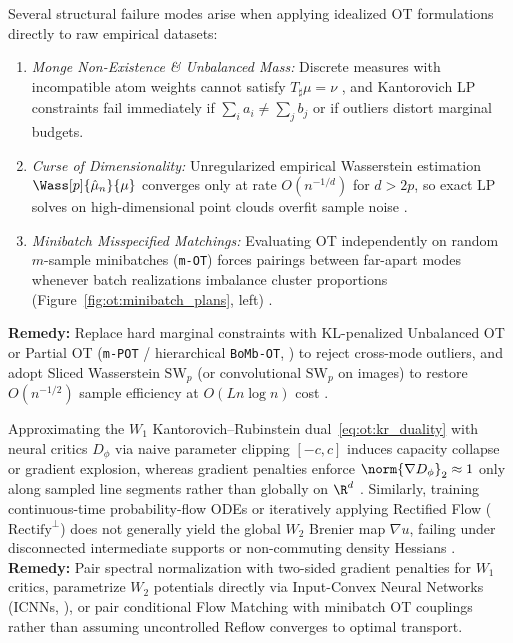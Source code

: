 \documentclass[../../../../master.tex]{subfiles}
\begin{document}
\begin{pitfall}
\label{pit:ot:support_minibatch}
Several structural failure modes arise when applying idealized OT formulations directly to raw empirical datasets:
\begin{enumerate}[leftmargin=1.4em]
  \item \emph{Monge Non-Existence \& Unbalanced Mass:} Discrete measures with incompatible atom weights cannot satisfy $T_\sharp \mu = \nu$ , and Kantorovich LP constraints fail immediately if $\sum_i a_i \ne \sum_j b_j$ or if outliers distort marginal budgets.
  \item \emph{Curse of Dimensionality:} Unregularized empirical Wasserstein estimation $\Wass[p]{\hat{\mu}_n}{\mu}$ converges only at rate $O(n^{-1/d})$ for $d > 2p$, so exact LP solves on high-dimensional point clouds overfit sample noise  .
  \item \emph{Minibatch Misspecified Matchings:} Evaluating OT independently on random $m$-sample minibatches (\texttt{m-OT}) forces pairings between far-apart modes whenever batch realizations imbalance cluster proportions (Figure~\ref{fig:ot:minibatch_plans}, left) .
\end{enumerate}
\textbf{Remedy:} Replace hard marginal constraints with KL-penalized Unbalanced OT or Partial OT (\texttt{m-POT} / hierarchical \texttt{BoMb-OT}, ) to reject cross-mode outliers, and adopt Sliced Wasserstein $\mathrm{SW}_p$ (or convolutional $\mathrm{SW}_p$ on images) to restore $O(n^{-1/2})$ sample efficiency at $O(L n \log n)$ cost .
\end{pitfall}

\begin{pitfall}
\label{pit:ot:wgan_flow}
Approximating the $W_1$ Kantorovich--Rubinstein dual~\eqref{eq:ot:kr_duality} with neural critics $D_\phi$ via naive parameter clipping $[-c, c]$ induces capacity collapse or gradient explosion, whereas gradient penalties enforce $\norm{\nabla D_\phi}_2 \approx 1$ only along sampled line segments rather than globally on $\R^d$ . Similarly, training continuous-time probability-flow ODEs or iteratively applying Rectified Flow ($\mathrm{Rectify}^\perp$) does not generally yield the global $W_2$ Brenier map $\nabla u$, failing under disconnected intermediate supports or non-commuting density Hessians .
\textbf{Remedy:} Pair spectral normalization with two-sided gradient penalties for $W_1$ critics, parametrize $W_2$ potentials directly via Input-Convex Neural Networks (ICNNs, ), or pair conditional Flow Matching with minibatch OT couplings rather than assuming uncontrolled Reflow converges to optimal transport.
\end{pitfall}
\end{document}
